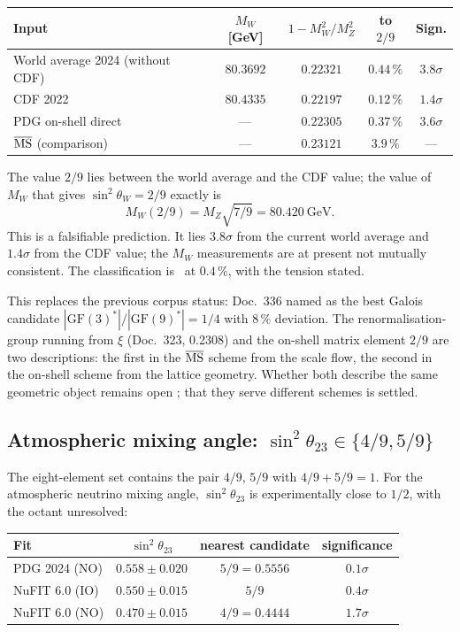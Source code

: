 \begin{center}
\small\begin{tabular}{@{}lcccc@{}}
\toprule
Input & $M_W$ [GeV] & $1-M_W^2/M_Z^2$ & to $2/9$ & Sign. \\
\midrule
World average 2024 (without CDF) & $80.3692$ & $0.22321$ & $0.44\,\%$ & $3.8\sigma$ \\
CDF 2022 & $80.4335$ & $0.22197$ & $0.12\,\%$ & $1.4\sigma$ \\
PDG on-shell direct & --- & $0.22305$ & $0.37\,\%$ & $3.6\sigma$ \\
$\overline{\rm MS}$ (comparison) & --- & $0.23121$ & $3.9\,\%$ & --- \\
\bottomrule
\end{tabular}
\end{center}

The value $2/9$ lies between the world average and the CDF value; the value
of $M_W$ that gives $\sin^2\theta_W = 2/9$ exactly is
\[
  M_W(2/9) = M_Z\sqrt{7/9} = 80.420\ \text{GeV}.
\]
This is a falsifiable prediction. It lies $3.8\sigma$ from the current world
average and $1.4\sigma$ from the CDF value; the $M_W$ measurements are at
present not mutually consistent. The classification is \KM~at $0.4\,\%$,
with the tension stated.

This replaces the previous corpus status: Doc.~336 named as the best Galois
candidate $|\mathrm{GF}(3)^*|/|\mathrm{GF}(9)^*| = 1/4$ with $8\,\%$
deviation. The renormalisation-group running from $\xi$ (Doc.~323, 0.2308)
and the on-shell matrix element $2/9$ are two descriptions: the first in the
$\overline{\rm MS}$ scheme from the scale flow, the second in the on-shell
scheme from the lattice geometry. Whether both describe the same geometric
object remains open \SM; that they serve different schemes is settled.

\subsection{Atmospheric mixing angle: \texorpdfstring{$\sin^2\theta_{23}\in\{4/9,5/9\}$}{sin2 theta23 in \{4/9, 5/9\}} \KM}

The eight-element set contains the pair $4/9$, $5/9$ with $4/9+5/9 = 1$. For
the atmospheric neutrino mixing angle, $\sin^2\theta_{23}$ is experimentally
close to $1/2$, with the octant unresolved:

\begin{center}
\begin{tabular}{@{}lccc@{}}
\toprule
Fit & $\sin^2\theta_{23}$ & nearest candidate & significance \\
\midrule
PDG 2024 (NO) & $0.558\pm0.020$ & $5/9 = 0.5556$ & $0.1\sigma$ \\
NuFIT 6.0 (IO) & $0.550\pm0.015$ & $5/9$ & $0.4\sigma$ \\
NuFIT 6.0 (NO) & $0.470\pm0.015$ & $4/9 = 0.4444$ & $1.7\sigma$ \\
\bottomrule
\end{tabular}
\end{center}


